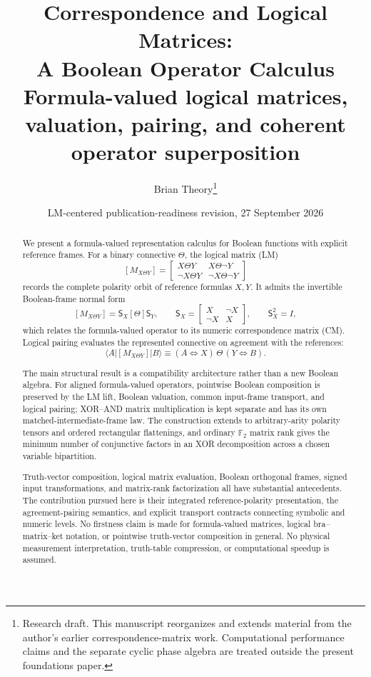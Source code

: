 \documentclass[11pt]{article}
\title{Correspondence and Logical Matrices:\\A Boolean Operator Calculus\\[0.4em]
\large Formula-valued logical matrices, valuation, pairing, and coherent operator superposition}
\author{Brian Theory\thanks{Research draft. This manuscript reorganizes and extends material from the author's earlier correspondence-matrix work. Computational performance claims and the separate cyclic phase algebra are treated outside the present foundations paper.}}
\date{LM-centered publication-readiness revision, 27 September 2026}
\theoremstyle{definition}
\theoremstyle{remark}
\newcommand{\F}{\mathbb F}
\begin{document}
\maketitle

\begin{abstract}
We present a formula-valued representation calculus for Boolean functions with explicit reference frames.  For a binary connective $\Theta$, the logical matrix (LM)
\[
 [M_{X\Theta Y}]
 =\begin{bmatrix}
 X\Theta Y & X\Theta\neg Y\\
 \neg X\Theta Y & \neg X\Theta\neg Y
 \end{bmatrix}
\]
records the complete polarity orbit of reference formulas $X,Y$.  It admits the invertible Boolean-frame normal form
\[
 [M_{X\Theta Y}]=\mathsf S_X[\Theta]\mathsf S_Y,
 \qquad
 \mathsf S_X=\begin{bmatrix}X&\neg X\\ \neg X&X\end{bmatrix},
 \qquad \mathsf S_X^2=I,
\]
which relates the formula-valued operator to its numeric correspondence matrix (CM).  Logical pairing evaluates the represented connective on agreement with the references:
\[
 \langle A|[M_{X\Theta Y}]|B\rangle
 \equiv (A\Leftrightarrow X)\,\Theta\,(Y\Leftrightarrow B).
\]

The main structural result is a compatibility architecture rather than a new Boolean algebra.  For aligned formula-valued operators, pointwise Boolean composition is preserved by the LM lift, Boolean valuation, common input-frame transport, and logical pairing; XOR--AND matrix multiplication is kept separate and has its own matched-intermediate-frame law.  The construction extends to arbitrary-arity polarity tensors and ordered rectangular flattenings, and ordinary $\F_2$ matrix rank gives the minimum number of conjunctive factors in an XOR decomposition across a chosen variable bipartition.

Truth-vector composition, logical matrix evaluation, Boolean orthogonal frames, signed input transformations, and matrix-rank factorization all have substantial antecedents.  The contribution pursued here is their integrated reference-polarity presentation, the agreement-pairing semantics, and explicit transport contracts connecting symbolic and numeric levels.  No firstness claim is made for formula-valued matrices, logical bra--matrix--ket notation, or pointwise truth-vector composition in general.  No physical measurement interpretation, truth-table compression, or computational speedup is assumed.
\end{abstract}
\end{document}
